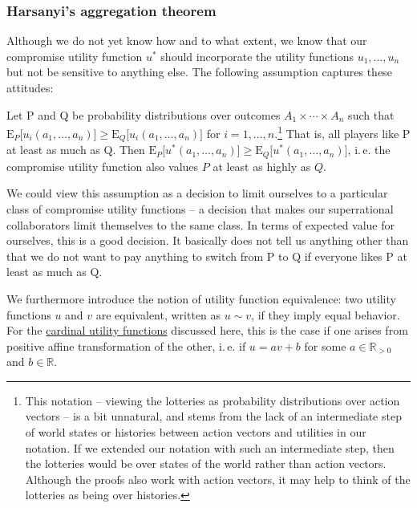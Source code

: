 \subsubsection{Harsanyi's aggregation
theorem}\label{harsanyis-aggregation-theorem}

Although we do not yet know how and to what extent, we know that our
compromise utility function \(u^{*}\) should incorporate the utility
functions \(u_{1},\dotsc,u_{n}\) but not be sensitive to anything else. The
following assumption captures these attitudes:

\vspace{3mm}

\begin{assumption}
\label{ass:compromise_util}
Let P and Q be probability distributions over outcomes \(A_{1} \times
\dotsm \times A_{n}\) such that \(\mathrm{E}_{P}\lbrack u_{i}(a_{1},\dotsc,a_{n})\rbrack \geq
\mathrm{E}_{Q}\lbrack u_{i}(a_{1},\dotsc,a_{n})\rbrack\) for \(i = 1,\dotsc,n\).\footnote{This notation --
    viewing the lotteries as probability distributions over action vectors -- is a bit unnatural,
    and stems from the lack of an intermediate step of world states or histories between action
    vectors and utilities in our notation. If we extended our notation with such an intermediate
    step, then the lotteries would be over states of the world rather than action vectors. Although
the proofs also work with action vectors, it may help to think of the lotteries as being over
histories.} That is, all players like P at least as much as Q. Then \(\mathrm{E}_{P}\lbrack
u^{*}(a_{1},\dotsc,a_{n})\rbrack \geq \mathrm{E}_{Q}\lbrack u^{*}(a_{1},\dotsc,a_{n})\rbrack\), i.\,e. the
compromise utility function also values \(P\) at least as highly as \(Q\).
\end{assumption}

We could view this assumption as a decision to limit ourselves to a
particular class of compromise utility functions -- a decision that
makes our superrational collaborators limit themselves to the same
class. In terms of expected value for ourselves, this is a good
decision. It basically does not tell us anything other than that we do
not want to pay anything to switch from P to Q if everyone likes P at
least as much as Q.

We furthermore introduce the notion of utility function equivalence: two
utility functions \(u\) and \(v\) are equivalent, written as
\(u \sim v\), if they imply equal behavior. For the
\href{https://en.wikipedia.org/wiki/Cardinal_utility}{cardinal
utility functions} discussed here, this is the case if one arises from
positive affine transformation of the other, i.\,e. if \(u = av + b\) for
some \(a \in \mathbb{R}_{> 0}\) and \(b \in \mathbb{R}\).

